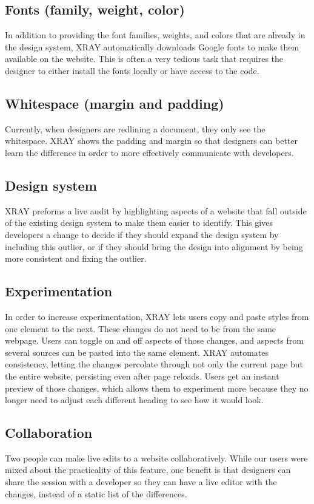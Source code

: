 \documentclass{sigchi}
\newcommand{\xray}{XRAY\xspace}
\begin{document}
\subsection{Fonts (family, weight, color)}
In addition to providing the font families, weights, and colors that are already in the design system, \xray 
automatically downloads Google fonts to make them available on the website. This is often a very tedious task that requires the designer to either install the fonts locally or have access to the code.

\subsection{Whitespace (margin and padding)}
Currently, when designers are redlining a document, they only see the whitespace. \xray shows the padding and margin so that designers can better learn the difference in order to more effectively communicate with developers. 

\subsection{Design system}
\xray preforms a live audit by highlighting aspects of a website that fall outside of the existing design system to make them easier to identify. This gives developers a change to decide if they should expand the design system by including this outlier, or if they should bring the design into alignment by being more consistent and fixing the outlier. 

\subsection{Experimentation}
In order to increase experimentation, \xray lets users copy and paste styles from one element to the next. These changes do not need to be from the same webpage. Users can toggle on and off aspects of those changes, and aspects from several sources can be pasted into the same element. \xray automates consistency, letting the changes percolate through not only the current page but the entire website, persisting even after page reloads. Users get an instant preview of those changes, which allows them to experiment more because they no longer need to adjust each different heading to see how it would look. 

\subsection{Collaboration}
Two people can make live edits to a website collaboratively. While our users were mixed about the practicality of this feature, one benefit is that designers can share the session with a developer so they can have a live editor with the changes, instead of a static list of the differences. 
\end{document}
